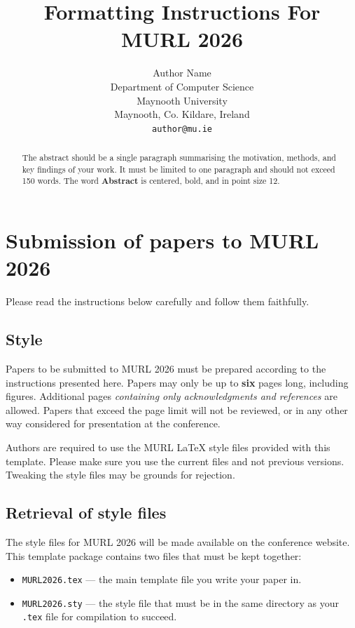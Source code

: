 \documentclass{article}
\title{Formatting Instructions For MURL 2026}
\author{%
  Author Name \\
  Department of Computer Science\\
  Maynooth University\\
  Maynooth, Co. Kildare, Ireland \\
  \texttt{author@mu.ie} \\
}
\begin{document}
\maketitle


\begin{abstract}
  The abstract should be a single paragraph summarising the motivation,
  methods, and key findings of your work. It must be limited to one paragraph
  and should not exceed 150 words. The word \textbf{Abstract} is centered,
  bold, and in point size 12.
\end{abstract}


\section{Submission of papers to MURL 2026}


Please read the instructions below carefully and follow them faithfully.


\subsection{Style}


Papers to be submitted to MURL 2026 must be prepared according to the
instructions presented here. Papers may only be up to {\bf six} pages long,
including figures. Additional pages \emph{containing only acknowledgments and
references} are allowed. Papers that exceed the page limit will not be
reviewed, or in any other way considered for presentation at the conference.

Authors are required to use the MURL \LaTeX{} style files provided with this
template. Please make sure you use the current files and not previous versions.
Tweaking the style files may be grounds for rejection.


\subsection{Retrieval of style files}


The style files for MURL 2026 will be made available on the conference website.
This template package contains two files that must be kept together:
\begin{itemize}
  \item \verb+MURL2026.tex+ — the main template file you write your paper in.
  \item \verb+MURL2026.sty+ — the style file that must be in the same directory
  as your \verb+.tex+ file for compilation to succeed.
\end{itemize}
\end{document}
